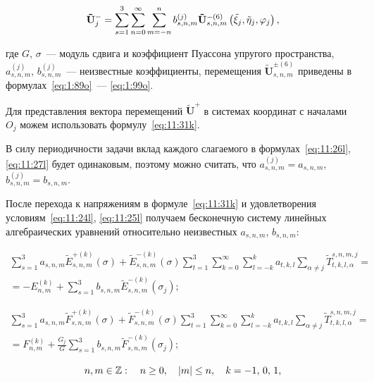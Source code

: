 \begin{equation}
\mathbf{\tilde U}_j^- = {\sum\limits_{s = 1}^3 {\sum\limits_{n = 0}^\infty  {\sum\limits_{m=-n}^{n} {b_{s,n,m}^{(j)}} } } } {\bf{\tilde U}}_{s,n,m}^{ - (6)}\left( {{\tilde\xi_j},{\tilde\eta _j},{\varphi _j}} \right),
\label{eq:11:27l}
\end{equation}

\noindent где $G$, $\sigma$~--- модуль сдвига и коэффициент Пуассона упругого пространства, $a_{s,n,m}^{(j)}$, $b_{s,n,m}^{(j)}$~--- неизвестные коэффициенты, перемещения $\mathbf{\tilde U}_{s,n,m}^{\pm(6)}$ приведены в формулах~\eqref{eq:1:89o}~--- \eqref{eq:1:99o}.

Для представления вектора перемещений $\mathbf{\tilde U}^+$ в системах координат с началами $O_j$ можем использовать формулу~\eqref{eq:11:31k}.

В силу периодичности задачи вклад каждого слагаемого в формулах~\eqref{eq:11:26l}, \eqref{eq:11:27l} будет одинаковым, поэтому можно считать, что $a_{s,n,m}^{(j)}=a_{s,n,m}$, $b_{s,n,m}^{(j)}=b_{s,n,m}$.

После перехода к напряжениям в формуле~\eqref{eq:11:31k} и удовлетворения условиям~\eqref{eq:11:24l}, \eqref{eq:11:25l} получаем бесконечную систему линейных алгебраических уравнений относительно неизвестных $a_{s,n,m}$, $b_{s,n,m}$:

\begin{multline}
\sum\limits_{s=1}^3 a_{s,n,m}\tilde E_{s,n,m}^{+(k)}(\sigma)+\tilde E_{s,n,m}^{-(k)}(\sigma)\sum\limits_{t=1}^3\sum\limits_{k=0}^\infty\sum\limits_{l=-k}^k a_{t,k,l}\sum\limits_{\alpha\neq j}\tilde T_{t,k,l,\alpha}^{s,n,m,j}= \\
=-E_{n,m}^{(k)}+\sum\limits_{s=1}^3 b_{s,n,m}\tilde E_{s,n,m}^{-(k)}(\sigma_j);
\label{eq:11:28l}
\end{multline}

\begin{multline}
\sum\limits_{s=1}^3 a_{s,n,m}\tilde F_{s,n,m}^{+(k)}(\sigma)+\tilde F_{s,n,m}^{-(k)}(\sigma)\sum\limits_{t=1}^3\sum\limits_{k=0}^\infty\sum\limits_{l=-k}^k a_{t,k,l}\sum\limits_{\alpha\neq j}\tilde T_{t,k,l,\alpha}^{s,n,m,j}= \\
=F_{n,m}^{(k)}+\frac{G_j}{G}\sum\limits_{s=1}^3 b_{s,n,m}\tilde F_{s,n,m}^{-(k)}(\sigma_j);
\label{eq:11:29l}
\end{multline}

\begin{equation}
n,m \in\mathbb{Z} :\quad n \ge 0,\quad |m| \le n,\quad k =  - 1,{\mkern 1mu} {\kern 1pt} 0,{\mkern 1mu} {\kern 1pt} 1,
\end{equation}

